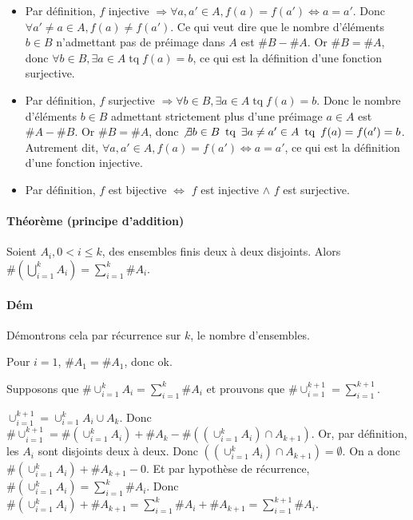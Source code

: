\documentclass{article}
\DeclareMathOperator{\tq}{\text{ tq }}
\begin{document}
			\begin{itemize}
				\item Par définition, $f$ injective $\Rightarrow \forall a, a' \in A, f(a) = f(a') \iff a = a'$. Donc $\forall a' \neq a \in A, f(a) \neq f(a')$.
				Ce qui veut dire que le nombre d'éléments $b \in B$ n'admettant pas de préimage dans $A$ est $\#B - \#A$. Or $\#B = \#A$, donc
				$\forall b \in B, \exists a \in A \tq f(a) = b$, ce qui est la définition d'une fonction surjective.
				\item Par définition, $f$ surjective $\Rightarrow \forall b \in B, \exists a \in A \tq f(a) = b$. Donc le nombre d'éléments $b \in B$ admettant
				strictement plus d'une préimage $a \in A$ est $\#A - \#B$. Or $\#B = \#A$, donc $\not \exists b \in B \tq \exists a \neq a' \in A \tq f(a) = f(a') = b$.
				Autrement dit, $\forall a, a' \in A, f(a) = f(a') \iff a = a'$, ce qui est la définition d'une fonction injective.
				\item Par définition, $f$ est bijective $\iff$ $f$ est injective $\land$ $f$ est surjective.
			\end{itemize}

			\paragraph{Théorème (principe d'addition)} Soient $A_i, 0 < i \leq k$, des ensembles finis deux à deux disjoints. Alors $\#\left(\bigcup_{i=1}^kA_i\right) =
			\sum_{i=1}^k\#A_i$.

			\paragraph{Dém} Démontrons cela par récurrence sur $k$, le nombre d'ensembles.

			Pour $i = 1$, $\#A_1 = \#A_1$, donc ok.

			Supposons que $\#\cup_{i=1}^kA_i = \sum_{i=1}^k\#A_i$ et prouvons que $\#\cup_{i=1}^{k+1} = \sum_{i=1}^{k+1}$.

			$\cup_{i=1}^{k+1} = \cup_{i=1}^kA_i \cup A_k$. Donc $\#\cup_{i=1}^{k+1} = \#(\cup_{i=1}^kA_i) + \#A_k - \#((\cup_{i=1}^kA_i) \cap A_{k+1})$.
			Or, par définition, les $A_i$ sont disjoints deux à deux. Donc $((\cup_{i=1}^kA_i) \cap A_{k+1}) = \emptyset$. On a donc $\#(\cup_{i=1}^kA_i) + \#A_{k+1} - 0$.
			Et par hypothèse de récurrence, $\#(\cup_{i=1}^kA_i) = \sum_{i=1}^k\#A_i$. Donc $\#(\cup_{i=1}^kA_i) + \#A_{k+1} = \sum_{i=1}^k\#A_i + \#A_{k+1} =
			\sum_{i=1}^{k+1}\#A_i$.
\end{document}
